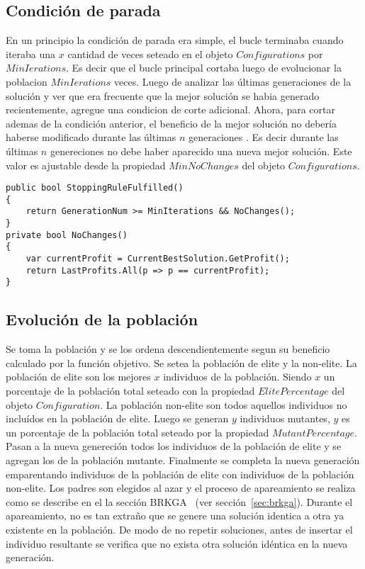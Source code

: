 \subsection{Condición de parada}

En un principio la condición de parada era simple, el bucle terminaba cuando iteraba una $x$ cantidad de veces seteado en el objeto $Configurations$ por $MinIerations$. Es decir que el bucle principal cortaba luego de evolucionar la poblacion $MinIerations$ veces. Luego de analizar las últimas generaciones de la solución y ver que era frecuente que la mejor solución se habia generado recientemente, agregue una condicion de corte adicional. Ahora, para cortar ademas de la condición anterior, el beneficio de la mejor solución no debería haberse modificado durante las últimas $n$ generaciones . Es decir durante las últimas $n$ genereciones no debe haber aparecido una nueva mejor solución. Este valor es ajustable desde la propiedad $MinNoChanges$ del objeto $Configurations$.

\bigskip

\begin{minipage}{\textwidth}
\begin{lstlisting} 
public bool StoppingRuleFulfilled()
{ 
    return GenerationNum >= MinIterations && NoChanges();
}
private bool NoChanges()
{
	var currentProfit = CurrentBestSolution.GetProfit();
	return LastProfits.All(p => p == currentProfit);
}
\end{lstlisting}
\end{minipage}

\subsection{Evolución de la población}

Se toma la población y se los ordena descendientemente segun su beneficio calculado por la función objetivo. Se setea la población de elite y la non-elite. La población de elite son los mejores $x$ individuos de la población. Siendo $x$ un porcentaje de la población total seteado con la propiedad $ElitePercentage$ del objeto $Configuration$. La población non-elite son todos aquellos individuos no incluídos en la población de elite. Luego se generan $y$ individuos mutantes, $y$ es un porcentaje de la población total seteado por la propiedad $MutantPercentage$. Pasan a la nueva genereción todos los individuos de la población de elite y se agregan los de la población mutante. Finalmente se completa la nueva generación emparentando individuos de la población de elite con individuos de la población non-elite. Los padres son elegidos al azar y el proceso de apareamiento se realiza como se describe en el la sección BRKGA ~(ver sección~\ref{sec:brkga}). Durante el apareamiento, no es tan extraño que se genere una solución identica a otra ya existente en la población. De modo de no repetir soluciones, antes de insertar el individuo resultante se verifica que no exista otra solución idéntica en la nueva generación.

